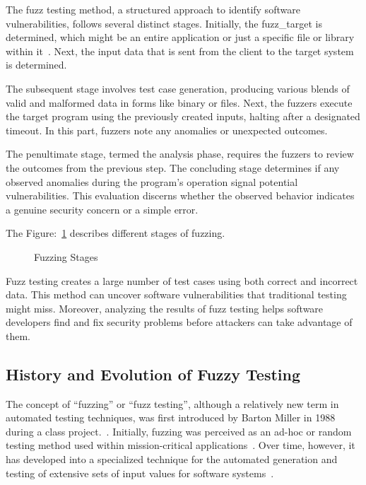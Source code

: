 The fuzz testing method, a structured approach to identify software vulnerabilities,
follows several distinct stages. Initially, the \gls{fuzz_target} is determined, which
might be an entire application or just a specific file or library within it~\cite{segedyfuzz}.
Next, the input data that is sent from the client to the target system is
determined.

The subsequent stage involves test case generation, producing various blends of
valid and malformed data in forms like binary or files. Next, the fuzzers
execute the target program using the previously created inputs, halting after a
designated timeout. In this part, fuzzers note any anomalies or unexpected outcomes.

The penultimate stage, termed the analysis phase, requires the fuzzers to review the
outcomes from the previous step. The concluding stage determines if any observed anomalies
during the program's operation signal potential vulnerabilities. This evaluation discerns
whether the observed behavior indicates a genuine security concern or a simple error.

The Figure:~\ref{fig:fuzzy_testing_phases_1} describes different stages of fuzzing.

\begin{figure}[h]
        \centering
        \caption{Fuzzing Stages~\cite{segedyfuzz}~\cite{9742291}}\label{fig:fuzzy_testing_phases_1}
\end{figure}

Fuzz testing creates a large number of test cases using both correct and
incorrect data. This method can uncover software vulnerabilities that
traditional testing might miss. Moreover, analyzing the results of fuzz testing
helps software developers find and fix security problems before attackers can
take advantage of them.

\subsection{History and Evolution of Fuzzy Testing}
The concept of ``fuzzing'' or ``fuzz testing'', although a relatively new term
in automated testing techniques, was first introduced by Barton Miller in 1988
during a class project.~\cite{takanen2009fuzzing}. Initially,
fuzzing was perceived as an ad-hoc or random testing method used within
mission-critical applications~\cite{WhatisaM24:online}. Over time, however, it
has developed into a specialized technique for the automated generation and
testing of extensive sets of input values for software systems~\cite{bohme2020fuzzing}.

